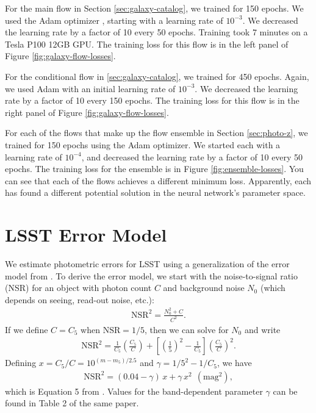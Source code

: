 \documentclass[twocolumn,twocolappendix]{aastex631}
\begin{document}
For the main flow in Section \ref{sec:galaxy-catalog}, we trained for 150 epochs.
We used the Adam optimizer \citep{adam}, starting with a learning rate of $10^{-3}$.
We decreased the learning rate by a factor of 10 every 50 epochs.
Training took 7 minutes on a Tesla P100 12GB GPU.
The training loss for this flow is in the left panel of Figure \ref{fig:galaxy-flow-losses}.

For the conditional flow in \ref{sec:galaxy-catalog}, we trained for 450 epochs.
Again, we used Adam with an initial learning rate of $10^{-3}$.
We decreased the learning rate by a factor of 10 every 150 epochs.
The training loss for this flow is in the right panel of Figure \ref{fig:galaxy-flow-losses}.

For each of the flows that make up the flow ensemble in Section \ref{sec:photo-z}, we trained for 150 epochs using the Adam optimizer.
We started each with a learning rate of $10^{-4}$, and decreased the learning rate by a factor of 10 every 50 epochs.
The training loss for the ensemble is in Figure \ref{fig:ensemble-losses}.
You can see that each of the flows achieves a different minimum loss.
Apparently, each has found a different potential solution in the neural network's parameter space.


\section{LSST Error Model}
\label{app:error-model}

We estimate photometric errors for LSST using a generalization of the error model from \citet{ivezic2019}.
To derive the error model, we start with the noise-to-signal ratio (NSR) for an object with photon count $C$ and background noise $N_0$ (which depends on seeing, read-out noise, etc.):
\begin{align}
    \text{NSR}^2 = \frac{N_0^2 + C}{C^2}.
\end{align}
If we define $C=C_5$ when $\text{NSR}= 1/5$, then we can solve for $N_0$ and write
\begin{align}
    \text{NSR}^2 = \frac{1}{C_5} \left( \frac{C_5}{C} \right) + \left[ \left( \frac{1}{5} \right)^2 - \frac{1}{C_5} \right] \left( \frac{C_5}{C} \right)^2.
\end{align}
Defining $x = C_5/C = 10^{(m-m_5)/2.5}$ and $\gamma = 1/5^2 - 1/C_5$, we have
\begin{align}
    \text{NSR}^2 = (0.04 - \gamma) \, x + \gamma \, x^2 ~~ (\text{mag}^2),
\end{align}
which is Equation 5 from \citet{ivezic2019}.
Values for the band-dependent parameter $\gamma$ can be found in Table 2 of the same paper.
\end{document}
